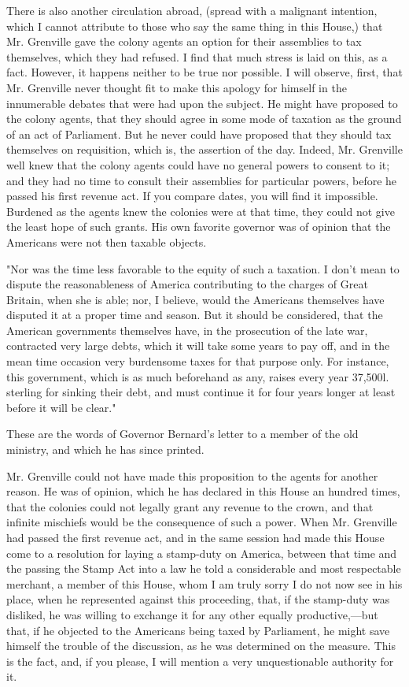 There is also another circulation abroad, (spread with a malignant intention, which I cannot attribute to those who say the same thing in this House,) that Mr. Grenville gave the colony agents an option for their assemblies to tax themselves, which they had refused. I find that much stress is laid on this, as a fact. However, it happens neither to be true nor possible. I will observe, first, that Mr. Grenville never thought fit to make this apology for himself in the innumerable debates that were had upon the subject. He might have proposed to the colony agents, that they should agree in some mode of taxation as the ground of an act of Parliament. But he never could have proposed that they should tax themselves on requisition, which is, the assertion of the day. Indeed, Mr. Grenville well knew that the colony agents could have no general powers to consent to it; and they had no time to consult their assemblies for particular powers, before he passed his first revenue act. If you compare dates, you will find it impossible. Burdened as the agents knew the colonies were at that time, they could not give the least hope of such grants. His own favorite governor was of opinion that the Americans were not then taxable objects.

"Nor was the time less favorable to the equity of such a taxation. I don't mean to dispute the reasonableness of America contributing to the charges of Great Britain, when she is able; nor, I believe, would the Americans themselves have disputed it at a proper time and season. But it should be considered, that the American governments themselves have, in the prosecution of the late war, contracted very large debts, which it will take some years to pay off, and in the mean time occasion very burdensome taxes for that purpose only. For instance, this government, which is as much beforehand as any, raises every year 37,500l. sterling for sinking their debt, and must continue it for four years longer at least before it will be clear."

These are the words of Governor Bernard's letter to a member of the old ministry, and which he has since printed.

Mr. Grenville could not have made this proposition to the agents for another reason. He was of opinion, which he has declared in this House an hundred times, that the colonies could not legally grant any revenue to the crown, and that infinite mischiefs would be the consequence of such a power. When Mr. Grenville had passed the first revenue act, and in the same session had made this House come to a resolution for laying a stamp-duty on America, between that time and the passing the Stamp Act into a law he told a considerable and most respectable merchant, a member of this House, whom I am truly sorry I do not now see in his place, when he represented against this proceeding, that, if the stamp-duty was disliked, he was willing to exchange it for any other equally productive,—but that, if he objected to the Americans being taxed by Parliament, he might save himself the trouble of the discussion, as he was determined on the measure. This is the fact, and, if you please, I will mention a very unquestionable authority for it.

